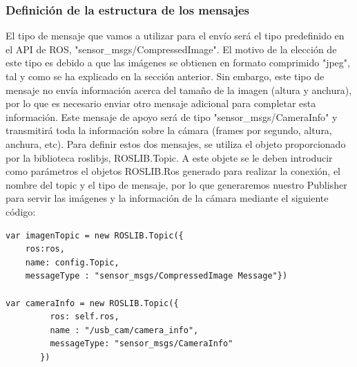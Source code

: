 \subsubsection{Definición de la estructura de los mensajes}
El tipo de mensaje que vamos a utilizar para el envío será el tipo predefinido en el API de ROS, "sensor\_msgs/CompressedImage". El motivo de la elección de este tipo es debido a que las imágenes se obtienen en formato comprimido "jpeg", tal y como se ha explicado en la sección anterior. Sin embargo, este tipo de mensaje no envía información acerca del tamaño de la imagen (altura y anchura), por lo que es necesario enviar otro mensaje adicional para completar esta información. Este mensaje de apoyo será de tipo "sensor\_msgs/CameraInfo" y transmitirá toda la información sobre la cámara (frames por segundo, altura, anchura, etc). Para definir estos dos mensajes, se utiliza el objeto proporcionado por la biblioteca roslibjs, ROSLIB.Topic. A este objete se le deben introducir como parámetros el objetos ROSLIB.Ros generado para realizar la conexión, el nombre del topic y el tipo de mensaje, por lo que generaremos nuestro Publisher para servir las imágenes y la información de la cámara mediante el siguiente código:
\begin{lstlisting}[frame=single]
var imagenTopic = new ROSLIB.Topic({
	ros:ros, 
	name: config.Topic, 
	messageType : "sensor_msgs/CompressedImage Message"})
	
var cameraInfo = new ROSLIB.Topic({
         ros: self.ros,
         name : "/usb_cam/camera_info",
         messageType: "sensor_msgs/CameraInfo"
       })

\end{lstlisting}

